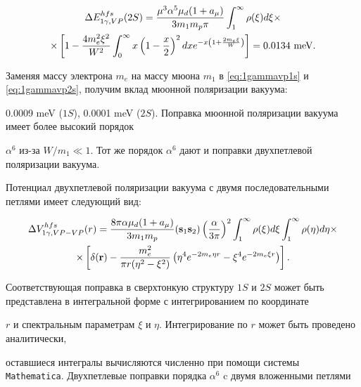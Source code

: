 \begin{multline}

\label{eq:1gammavp2s}

\Delta E_{1\gamma,VP}^{hfs}(2S)=\frac{\mu^3 \alpha^5\mu_d(1+a_\mu)}{3m_1m_p\pi}\int_1^\infty\rho(\xi)d\xi\times

\\

\times\left[1-\frac{4m_e^2\xi^2}{W^2}\int_0^\infty x\left(1-\frac{x}{2}\right)^2dxe^{-x\left(1+\frac{2m_e\xi}{W}\right)}\right]=

0.0134~\rm meV.

\end{multline}



Заменяя массу электрона $m_e$ на массу мюона $m_1$ в \eqref{eq:1gammavp1s} и \eqref{eq:1gammavp2s}, получим вклад мюонной поляризации вакуума:

0.0009 meV ($1S$), 0.0001 meV ($2S$). Поправка мюонной поляризации вакуума имеет более высокий порядок

$\alpha^6$ из-за $W/m_1\ll 1$. Тот же порядок $\alpha^6$ дают и поправки двухпетлевой поляризации вакуума.

Потенциал двухпетлевой поляризации вакуума с двумя последовательными петлями имеет следующий вид:

\begin{multline}

\label{eq:1gamma2looppot}

\Delta V_{1\gamma,VP-VP}^{hfs}(r)=\frac{8\pi\alpha\mu_d(1+a_\mu)}{3m_1m_p}

({\bf s}_1{\bf s}_2)\left(\frac{\alpha}

{3\pi}\right)^2\int_1^\infty\rho(\xi)d\xi\int_1^\infty\rho(\eta)d\eta\times

\\

\times\left[\delta({\bf r})-\frac{m_e^2}{\pi r(\eta^2-\xi^2)}\left(\eta^4 e^{-2m_e\eta r}-

\xi^4 e^{-2m_e\xi r}\right)\right].

\end{multline}

Соответствующая поправка в сверхтонкую структуру $1S$ и $2S$ может быть представлена в интегральной форме с интегрированием по координате

$r$ и спектральным параметрам $\xi$ и $\eta$. Интегрирование по $r$ может быть проведено аналитически,

оставшиеся интегралы вычисляются численно при помощи системы {\tt Mathematica}. Двухпетлевые поправки порядка $\alpha^6$ c двумя вложенными петлями

